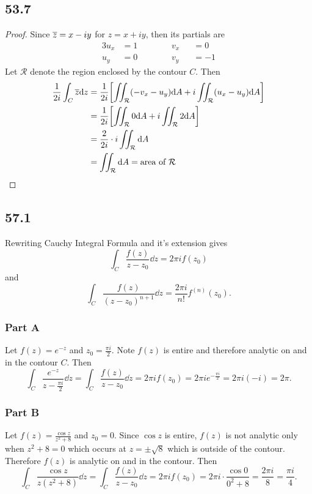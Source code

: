 \documentclass[12pt,titlepage]{extarticle}
\begin{document}
\subsection*{53.7}
\begin{proof}
    Since $\overline{z} = x - iy$ for $z = x + iy$, then its partials are
    \begin{alignat*}{3}
        u_x &= 1 \hspace{1cm}&& v_x &&= 0 \\
        u_y &= 0 && v_y &&= -1
    \end{alignat*}
    Let $\mathcal{R}$ denote the region enclosed by the contour $C$. Then
    \begin{align*}
        \frac{1}{2i} \int_C \overline{z} \dd z &= \frac{1}{2i} \qty[\iint_{\mathcal{R}} (-v_x - u_y) \dd A + i \iint_{\mathcal{R}} (u_x - u_y) \dd A] \\
        &= \frac{1}{2i} \qty[
            \iint_{\mathcal{R}} 0 \dd A + i \iint_{\mathcal{R}} 2 \dd A
        ] \\
        &= \frac{2}{2i} \cdot i \iint_{\mathcal{R}} \dd A \\
        &= \iint_{\mathcal{R}} \dd A = \text{area of } \mathcal{R} \qedhere
    \end{align*}
\end{proof}

\subsection*{57.1}
Rewriting Cauchy Integral Formula and it's extension gives
\[
    \int_C \frac{f(z)}{z - z_0} \dd z = 2 \pi i f(z_0)
\]
and
\[
    \int_C \frac{f(z)}{(z - z_0)^{n+1}} \dd z = \frac{2 \pi i}{n!} f^{(n)}(z_0)
.\]

\subsubsection*{Part A}
Let $f(z) = e^{-z}$ and $z_0 = \frac{\pi i}{2}$. Note $f(z)$ is entire and therefore analytic on and in the contour $C$. Then
\[
    \int_C \frac{e^{-z}}{z - \frac{\pi i}{2}} \dd z = \int_C \frac{f(z)}{z - z_0} \dd z = 2 \pi i f(z_0) = 2 \pi i e^{-\frac{\pi i}{2}} = 2 \pi i (-i) = 2 \pi
.\]

\subsubsection*{Part B}
Let $f(z) = \frac{\cos z}{z^2 + 8}$ and $z_0 = 0$. Since $\cos z$ is entire, $f(z)$ is not analytic only when $z^2 + 8 = 0$ which occurs at $z = \pm \sqrt{8}$ which is outside of the contour. Therefore $f(z)$ is analytic on and in the contour. Then
\[
    \int_C \frac{\cos z}{z(z^2 + 8)} \dd z = \int_C \frac{f(z)}{z - z_0} \dd z = 2 \pi i f(z_0) = 2 \pi i \cdot \frac{\cos 0}{0^2 + 8} = \frac{2 \pi i}{8} = \frac{\pi i}{4}
.\]
\end{document}
